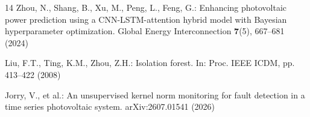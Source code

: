 \documentclass[runningheads]{llncs}
\begin{document}
\begin{thebibliography}{14}
 Zhou, N., Shang, B., Xu, M., Peng, L., Feng, G.: Enhancing photovoltaic power prediction using a CNN-LSTM-attention hybrid model with Bayesian hyperparameter optimization. Global Energy Interconnection \textbf{7}(5), 667--681 (2024)

 Liu, F.T., Ting, K.M., Zhou, Z.H.: Isolation forest. In: Proc. IEEE ICDM, pp. 413--422 (2008)

 Jorry, V., et al.: An unsupervised kernel norm monitoring for fault detection in a time series photovoltaic system. arXiv:2607.01541 (2026)


\end{thebibliography}
\end{document}
